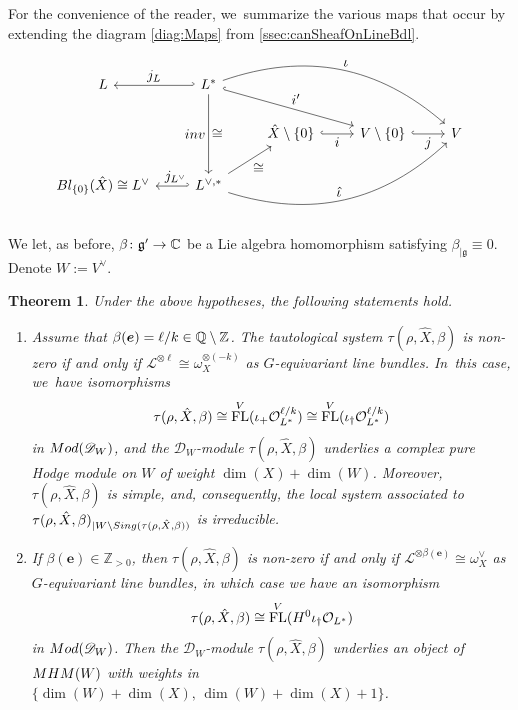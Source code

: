 \documentclass[11pt]{article}
\let\mathds\mathbb
\let\ts\textstyle
\newcommand{\bme}{{\boldsymbol{e}}}
\newtheorem{thm}{Theorem}[section]
\newcommand{\dZ}{{\mathds Z}}\let\mbz\dZ\let\Z\dZ
\newcommand{\cD}{\mathscr{D}}
\newcommand{\Ell}{\mathscr{L}}
\newcommand{\cO}{\mathcal{O}}\let\O\cO
\newcommand{\frg}{\mathfrak{g}}
\DeclareMathOperator{\FL}{\textup{FL}}
\newcommand{\MHM}{\textup{MHM}}
\newcommand\restr[2]{{#1_{| {#2}}}}
\begin{document}
For the convenience of the reader, we~summarize the various maps that occur by extending the diagram \eqref{diag:Maps} from \cref{ssec:canSheafOnLineBdl}.
\begin{equation}\label{diag:Maps2}
\begin{tikzcd}
L & L^*\ar[swap,hook']{l}{\ts j_L} \ar[swap]{dd}{\ts \textup{inv}}[swap]{\ts \cong} \ar[hook]{rrd}{\ts i'} \ar[bend left]{rrrd}{\ts \iota} & & & \\
&&\hat{X} \setminus \{0\} \ar[hook,swap]{r}{\ts i} & V \setminus \{0\} \ar[hook,swap]{r}{\ts j} & V
\\
\textup{Bl}_{\{0\}}(\hat{X})\cong L^\vee& L^{\vee,*}\ar[hook',swap]{l}{\ts \;\,j_{L^\vee}} \ar[swap]{ur}{\ts \cong}
\ar[bend right]{rrru}{\ts \hat{\iota}}&&&
\end{tikzcd}
\end{equation}

We let, as before,
$\beta \colon \frg' \to \C$ be a Lie algebra homomorphism satisfying $\restr{\beta}{\frg} \equiv 0$. Denote $W := V^\vee$.

\begin{thm}\label{theo:tau_is_MHM}
Under the above hypotheses, the following statements hold.
\begin{enumerate}
\item\label{theo:tau_is_MHM1}
Assume that
$\beta(\bme) = \ell/k \in \Q \setminus \Z$. The tautological system $\tau(\rho,\hat{X},\beta)$ is non-zero if and only if $\Ell^{\otimes \ell} \cong \omega_X^{\otimes (-k)}$ as $G$-equivariant line bundles. In~this case, we~have
isomorphisms
\[
\tau(\rho,\hat X, \beta) \cong \FL^V(\iota_+ \O_{L^*}^{\ell/k}) \cong \FL^V(\iota_\dag \O_{L^*}^{\ell/k})
\]
in $\textup{Mod}(\mathscr{D}_W)$, and the $\mathscr{D}_W$\nobreakdash-mod\-ule $\tau(\rho,\hat X, \beta) $ underlies a complex pure Hodge module on $W$ of weight $\dim(X)+\dim(W)$. Moreover, $\tau(\rho,\hat{X},\beta)$ is simple, and, consequently, the local system associated to
$\tau(\rho,\hat{X},\beta)_{| W \backslash \textup{Sing}(\tau(\rho,\hat{X},\beta))}$ is irreducible.
\item\label{theo:tau_is_MHM2}
If $\beta(\bme)\in \dZ_{>0}$,
then $\tau(\rho,\hat{X},\beta)$ is non-zero if and only if $\Ell^{\otimes \beta(\bme)} \cong \omega_X^\vee$ as $G$-equivariant line bundles, in which case we have an isomorphism
\[
\tau(\rho, \hat{X},\beta) \cong \FL^V(H^0\iota_\dag \cO_{L^*})
\]
in $\textup{Mod}(\cD_W)$. Then the $\mathscr D_W$\nobreakdash-mod\-ule $\tau(\rho, \hat{X},\beta)$ underlies an object of $\MHM(W)$ with weights in $\{\dim(W)+\dim(X),\,\dim(W)+\dim(X)+1\}$.
\end{enumerate}
\end{thm}
\end{document}

